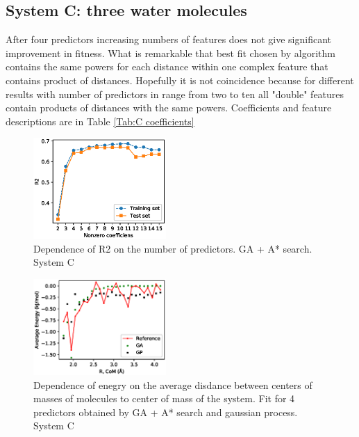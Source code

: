 \documentclass[aps,prl,reprint,amsmath,amssymb,nature]{revtex4-1}
\begin{document}

\subsection{System C: three water molecules}

After four predictors increasing numbers of features does not give significant improvement in fitness. What is remarkable that best fit chosen by algorithm contains the same powers for each distance within one complex feature that contains product of distances. Hopefully it is not coincidence because for different results with number of predictors in range from two to ten all "double" features contain products of distances with the same powers. Coefficients and feature descriptions are in Table \ref{Tab:C coefficients}

\begin{figure}
\includegraphics[width=0.45\textwidth]{media/C_GA_PATH_R2.eps}
\caption{Dependence of R2 on the number of predictors. GA + A* search. System C}\label{Fig:C_R2}
\end{figure}

\begin{figure}
\includegraphics[width=0.45\textwidth]{media/C_Energy_4_predictors.eps}
\caption{Dependence of enegry on the average disdance between centers of masses of molecules to center of mass of the system. Fit for 4 predictors obtained by GA + A* search and gaussian process. System C}\label{Fig:C_Energy_4_predictors}
\end{figure}
\end{document}
